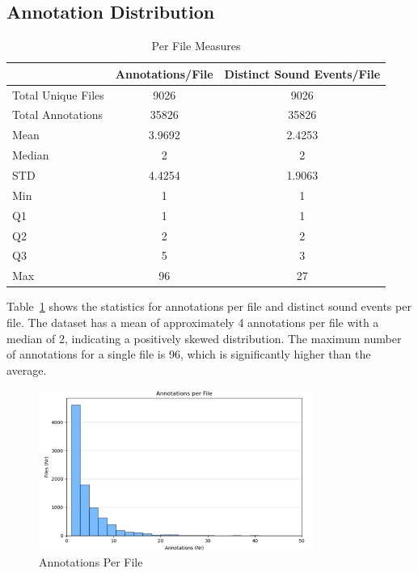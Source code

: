 \documentclass{article}
\begin{document}
\subsection{Annotation Distribution}

\begin{table}[H]
  \caption{Per File Measures}
  \label{tab:per_file}
  \centering
  \begin{tabular}{lcc}
    \toprule
    & Annotations/File & Distinct Sound Events/File \\
    \midrule
    Total Unique Files & 9026 & 9026 \\
    Total Annotations & 35826 & 35826 \\
    Mean & 3.9692 & 2.4253 \\
    Median & 2 & 2 \\
    STD & 4.4254 & 1.9063 \\
    Min & 1 & 1 \\
    Q1 & 1 & 1 \\
    Q2 & 2 & 2 \\
    Q3 & 5 & 3 \\
    Max & 96 & 27 \\
    \bottomrule
  \end{tabular}
\end{table}

Table~\ref{tab:per_file} shows the statistics for annotations per file and distinct sound events per file. The dataset has a mean of approximately 4 annotations per file with a median of 2, indicating a positively skewed distribution. The maximum number of annotations for a single file is 96, which is significantly higher than the average.

\begin{figure}[H]
  \centering
  \includegraphics[width=0.8\textwidth]{figures/annotation_quality/annotations_per_file.png}
  \caption{Annotations Per File}
  \label{fig:annotations_per_file}
\end{figure}
\end{document}
